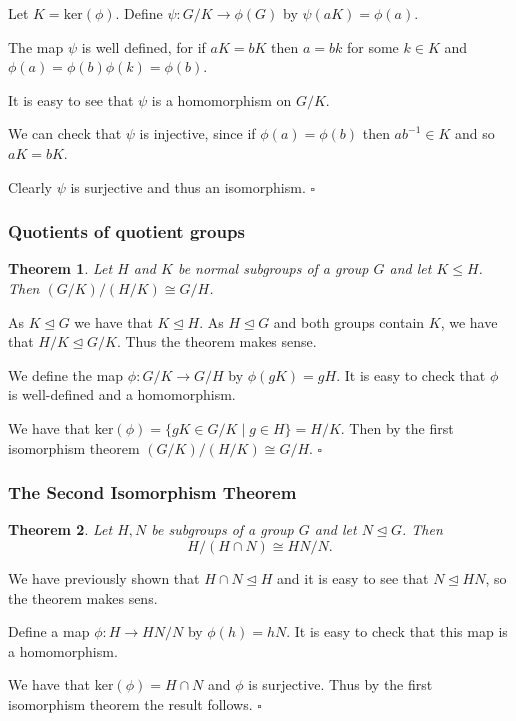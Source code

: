 \documentclass[10pt]{article}
\newtheorem{theorem}{Theorem}[section]
\newenvironment{proof}[1][Proof]{\begin{trivlist}
\item[\hskip \labelsep {\itshape #1}]}{\end{trivlist}}
\begin{document}
\begin{proof}
Let $K = \mbox{ker}(\phi)$. Define $\psi : G/K \to \phi(G)$ by $\psi(aK) = \phi(a)$.

The map $\psi$ is well defined, for if $aK = bK$ then $a = bk$ for some $k \in K$ and $\phi(a) = \phi(b)\phi(k) = \phi(b)$.

It is easy to see that $\psi$ is a homomorphism on $G/K$.

We can check that $\psi$ is injective, since if $\phi(a) = \phi(b)$ then $ab^{-1} \in K$ and so $aK = bK$.

Clearly $\psi$ is surjective and thus an isomorphism. $\square$
\end{proof}

\subsubsection{Quotients of quotient groups}

\begin{theorem}
Let $H$ and $K$ be normal subgroups of a group $G$ and let $K \leq H$. Then $(G/K)/(H/K) \cong G/H$.
\end{theorem}

\begin{proof}
As $K \mathrel{\unlhd} G$ we have that $K \mathrel{\unlhd} H$. As $H \mathrel{\unlhd} G$ and both groups contain $K$, we have that $H/K \mathrel{\unlhd} G/K$. Thus the theorem makes sense.

We define the map $\phi : G/K \to G/H$ by $\phi(gK) = gH$. It is easy to check that $\phi$ is well-defined and a homomorphism.

We have that ker$(\phi) = \{gK \in G/K \;|\; g \in H\} = H/K$. Then by the first isomorphism theorem $(G/K)/(H/K) \cong G/H$. $\square$
\end{proof}

\subsubsection{The Second Isomorphism Theorem}

\begin{theorem}
Let $H, N$ be subgroups of a group $G$ and let $N \mathrel{\unlhd} G$. Then
$$H/(H\cap N) \cong HN/N.$$
\end{theorem}

\begin{proof}
We have previously shown that $H\cap N \mathrel{\unlhd} H$ and it is easy to see that $N \mathrel{\unlhd} HN$, so the theorem makes sens.

Define a map $\phi : H \to HN/N$ by $\phi(h) = hN$. It is easy to check that this map is a homomorphism.

We have that ker$(\phi) = H\cap N$ and $\phi$ is surjective. Thus by the first isomorphism theorem the result follows. $\square$
\end{proof}
\end{document}
